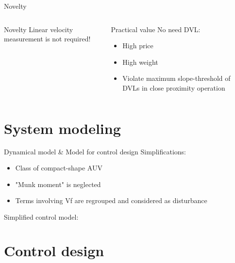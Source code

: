 \documentclass{beamer}
\begin{document}
\begin{frame}{Novelty}

\begin{columns}[t]
	\begin{exampleblock}{Novelty}
	Linear velocity measurement is not required!
	\end{exampleblock}
	

	
	\begin{exampleblock}{Practical value}
	No need DVL: \\
	\begin{itemize}
		\item High price
		\item High weight
		\item Violate maximum slope-threshold of DVLs in close proximity operation
	\end{itemize}
	\end{exampleblock}
\end{columns}
\end{frame}



\section{System modeling}

\begin{frame}{Dynamical model \& Model for control design}
Simplifications:
\begin{itemize}
	\item Class of compact-shape AUV
	\item "Munk moment" is neglected
	\item Terms involving Vf are regrouped and considered as disturbance
\end{itemize}
Simplified control model:


\end{frame}



\section{Control design}
\end{document}
